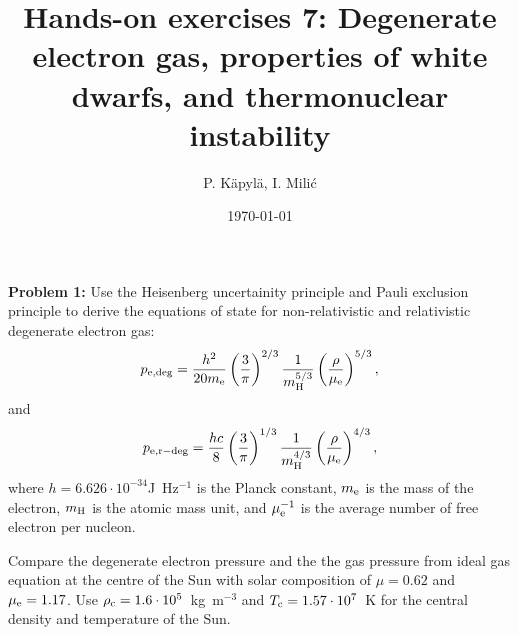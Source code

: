 \documentclass[12pt]{article}
\title{Hands-on exercises 7: Degenerate electron gas, properties of white dwarfs, and thermonuclear instability}
\author{P. K\"{a}pyl\"{a}, I. Mili\'{c}}
\date{\today}
\begin{document}
\maketitle

{\bf Problem 1:} Use the Heisenberg uncertainity principle and Pauli
exclusion principle to derive the equations of state for
non-relativistic and relativistic degenerate electron gas:
\begin{equation}
p_{\rm e,deg} = \frac{h^2}{20 m_{\rm e}} \left(\frac{3}{\pi} \right)^{2/3} \frac{1}{m_{\rm H}^{5/3}} \left( \frac{\rho}{\mu_{\rm e}} \right)^{5/3},
\end{equation}
and 
\begin{equation}
p_{\rm e,r-deg} = \frac{hc}{8} \left(\frac{3}{\pi} \right)^{1/3} \frac{1}{m_{\rm H}^{4/3}} \left( \frac{\rho}{\mu_{\rm e}} \right)^{4/3},
\end{equation}
where $h = 6.626\cdot 10^{-34}$J~Hz$^{-1}$ is the Planck constant,
$m_{\rm e}$ is the mass of the electron, $m_{\rm H}$ is the atomic
mass unit, and $\mu_{\rm e}^{-1}$ is the average number of free
electron per nucleon.

Compare the degenerate electron pressure and the the gas pressure from
ideal gas equation at the centre of the Sun with solar composition of
$\mu=0.62$ and $\mu_{\rm e} = 1.17$. Use $\rho_{\rm c} = 1.6\cdot
10^5$~kg~m$^{-3}$ and $T_{\rm c} = 1.57\cdot 10^7$~K for the central
density and temperature of the Sun.
\end{document}
